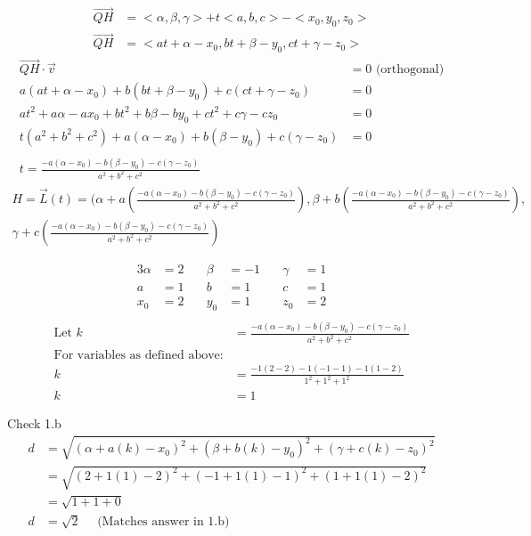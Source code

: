 \documentclass{article}
\begin{document}
\begin{align*}
\vec{QH} &= <\alpha, \beta, \gamma> + t<a, b, c> - <x_0, y_0, z_0> \\
\vec{QH} &= <at + \alpha - x_0, bt + \beta - y_0, ct + \gamma - z_0>
\end{align*}
\begin{align*}
\vec{QH} \cdot \vec{v} &= 0  \text{ (orthogonal)} \\
a(at + \alpha - x_0) + b(bt + \beta - y_0) + c(ct + \gamma - z_0) &= 0 \\
at^2 + a\alpha - ax_0 + bt^2 + b\beta - by_0 + ct^2 + c\gamma - cz_0 &= 0 \\
t(a^2 + b^2 + c^2) + a(\alpha - x_0) + b(\beta - y_0) + c(\gamma - z_0) &= 0 \\
\\
t = \frac{-a(\alpha - x_0) - b(\beta - y_0) - c(\gamma - z_0)}{a^2+b^2+c^2}
\end{align*}
\begin{equation*}
\begin{multlined}
H = \vec{L}(t) = (\alpha + a(\frac{-a(\alpha - x_0) - b(\beta - y_0) - c(\gamma - z_0)}{a^2+b^2+c^2}), \beta + b(\frac{-a(\alpha - x_0) - b(\beta - y_0) - c(\gamma - z_0)}{a^2+b^2+c^2}), \\\gamma + c(\frac{-a(\alpha - x_0) - b(\beta - y_0) - c(\gamma - z_0)}{a^2+b^2+c^2})
\end{multlined}
\end{equation*}

\begin{alignat*}{3}
\alpha &= 2 \quad & \beta &= -1 \quad & \gamma &= 1 \\
a &= 1    \quad & b &= 1    \quad & c &= 1\\
x_0 &= 2    \quad & y_0 &= 1  \quad & z_0 &= 2\\
\end{alignat*}
\begin{align*}
\text{Let } k &= \frac{-a(\alpha - x_0) - b(\beta - y_0) - c(\gamma - z_0)}{a^2+b^2+c^2} \\
\text{For variables as defined above:} \\
k &= \frac{-1(2-2) - 1(-1-1) - 1(1-2)}{1^2 + 1^2 + 1^2} \\
k &= 1
\end{align*}

Check 1.b
\begin{align*}
d &= \sqrt{(\alpha + a(k) - x_0)^2 + (\beta + b(k) - y_0)^2 + (\gamma + c(k) - z_0)^2} \\
&= \sqrt{(2 + 1(1) - 2)^2 + (-1 + 1(1) - 1)^2 + (1 + 1(1) - 2)^2} \\
&= \sqrt{1 + 1 + 0} \\
d &= \sqrt{2} \quad \text{ (Matches answer in 1.b)}
\end{align*}
\end{document}
